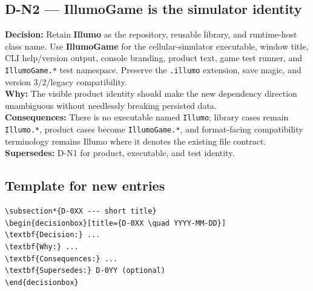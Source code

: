 \subsection*{D-N2 --- IllumoGame is the simulator identity}
\begin{decisionbox}[title={D-N2 \quad 2026-08-18}]
\textbf{Decision:} Retain \textbf{Illumo} as the repository, reusable library,
and runtime-host class name. Use \textbf{IllumoGame} for the cellular-simulator
executable, window title, CLI help/version output, console branding, product
text, game test runner, and \texttt{IllumoGame.*} test namespace. Preserve the
\texttt{.illumo} extension, save magic, and version 3/2/legacy compatibility.\\
\textbf{Why:} The visible product identity should make the new dependency
direction unambiguous without needlessly breaking persisted data.\\
\textbf{Consequences:} There is no executable named \texttt{Illumo}; library
cases remain \texttt{Illumo.*}, product cases become \texttt{IllumoGame.*}, and
format-facing compatibility terminology remains Illumo where it denotes the
existing file contract.\\
\textbf{Supersedes:} D-N1 for product, executable, and test identity.
\end{decisionbox}

\subsection*{Template for new entries}
\begin{lstlisting}[language={}]
\subsection*{D-0XX --- short title}
\begin{decisionbox}[title={D-0XX \quad YYYY-MM-DD}]
\textbf{Decision:} ...
\textbf{Why:} ...
\textbf{Consequences:} ...
\textbf{Supersedes:} D-0YY (optional)
\end{decisionbox}
\end{lstlisting}
